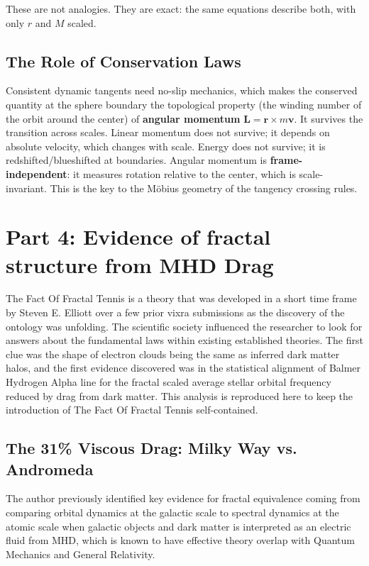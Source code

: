 \documentclass[11pt,a4paper]{article}
\begin{document}
These are not analogies. They are exact: the same equations describe both, with only $r$ and $M$ scaled.

\subsection{The Role of Conservation Laws}

Consistent dynamic tangents need no-slip mechanics, which makes the conserved quantity at the sphere boundary the topological property (the winding number of the orbit around the center) of \textbf{angular momentum} $\mathbf{L} = \mathbf{r} \times m\mathbf{v}$. It survives the transition across scales. Linear momentum does not survive; it depends on absolute velocity, which changes with scale. Energy does not survive; it is redshifted/blueshifted at boundaries. Angular momentum is \textbf{frame-independent}: it measures rotation relative to the center, which is scale-invariant. This is the key to the Möbius geometry of the tangency crossing rules.

\section{Part 4: Evidence of fractal structure from MHD Drag}

The Fact Of Fractal Tennis is a theory that was developed in a short time frame by Steven E. Elliott over a few prior vixra submissions as the discovery of the ontology was unfolding. The scientific society influenced the researcher to look for answers about the fundamental laws within existing established theories. The first clue was the shape of electron clouds being the same as inferred dark matter halos, and the first evidence discovered was in the statistical alignment of Balmer Hydrogen Alpha line for the fractal scaled average stellar orbital frequency reduced by drag from dark matter. This analysis is reproduced here to keep the introduction of The Fact Of Fractal Tennis self-contained.

\subsection{The 31\% Viscous Drag: Milky Way vs. Andromeda}

The author previously identified key evidence for fractal equivalence coming from comparing orbital dynamics at the galactic scale to spectral dynamics at the atomic scale when galactic objects and dark matter is interpreted as an electric fluid from MHD, which is known to have effective theory overlap with Quantum Mechanics and General Relativity.
\end{document}

